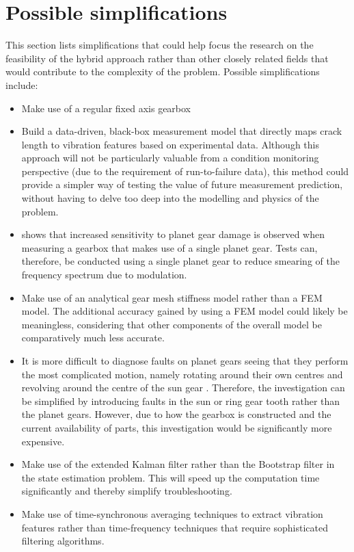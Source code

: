 \section{Possible simplifications}
This section lists simplifications that could help focus the research on the feasibility of the hybrid approach rather than other closely related fields that would contribute to the complexity of the problem. Possible simplifications include:

\begin{itemize}
	\item Make use of a regular fixed axis gearbox
	\item Build a data-driven, black-box measurement model that directly maps crack length to vibration features based on experimental data. Although this approach will not be particularly valuable from a condition monitoring perspective (due to the requirement of run-to-failure data), this method could provide a simpler way of testing the value of future measurement prediction, without having to delve too deep into the modelling and physics of the problem.  
	\item \cite{Smidt2009} shows that increased sensitivity to planet gear damage is observed when measuring a gearbox that makes use of a single planet gear. Tests can, therefore, be conducted using a single planet gear to reduce smearing of the frequency spectrum due to modulation.
	\item Make use of an analytical gear mesh stiffness model rather than a FEM model. The additional accuracy gained by using a FEM model could likely be meaningless, considering that other components of the overall model be comparatively much less accurate.
	\item  It is more difficult to diagnose faults on planet gears seeing that they perform the most complicated motion, namely rotating around their own centres and revolving around the centre of the sun gear \citep{Lei2014}. Therefore, the investigation can be simplified by introducing faults in the sun or ring gear tooth rather than the planet gears. However, due to how the gearbox is constructed and the current availability of parts, this investigation would be significantly more expensive. 
	\item Make use of the extended Kalman filter rather than the Bootstrap filter in the state estimation problem. This will speed up the computation time significantly and thereby simplify troubleshooting.  
	\item Make use of time-synchronous averaging techniques to extract vibration features rather than time-frequency techniques that require sophisticated filtering algorithms. 

\end{itemize}
